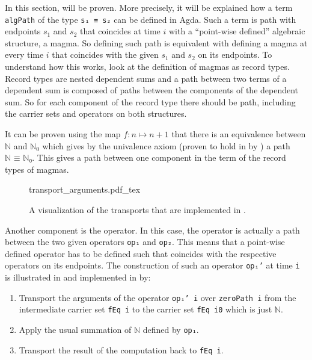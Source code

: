 \documentclass[12pt,a4paper,twoside,xetex]{book} %
\newcommand{\incfig}[1]{%
    \def\svgwidth{0.6\columnwidth}
    {#1.pdf_tex}
}
\begin{document}
In this section,  will be proven. More precisely, it will be explained how a term \texttt{algPath} of the type \texttt{s₁ ≡ s₂} can be defined in Agda. Such a term is path with endpoints $s_1$ and $s_2$ that coincides at time $i$ with a ``point-wise 
defined'' algebraic structure, a magma. So defining such path is equivalent 
with defining a magma at every time $i$ that coincides with the given $s_1$ and 
$s_2$ on its endpoints. To understand how this works, look at the definition of 
magmas as record types. Record types are nested dependent sums and a path 
between two terms of a dependent sum is composed of paths between the 
components of the dependent sum. So for each component of the record type there 
should be path, including the carrier sets and operators on both structures. 

It can be proven using the map $f: n \mapsto n + 1$ that there is an 
equivalence between $\mathbb{N}$ and $\mathbb{N}_0$ which gives by the 
univalence axiom (proven to hold in  by ) a 
path $\texttt{ℕ ≡ ℕ₀}$. This gives a path between one component in the term of 
the record types of magmas. 

\begin{figure}\label{transpop}
\centering
\incfig{transport_arguments}
\caption{A visualization of the transports that are implemented in .}
\end{figure}

Another component is the operator. In this case, the operator is actually a 
path between the two given operators \texttt{op₁} and \texttt{op₂}. This means that a point-wise defined 
operator has to be defined such that coincides with the respective operators on its endpoints. The construction of such an operator \texttt{opᵢ'} at time \texttt{i} is illustrated in  and implemented in  by:

\begin{enumerate}
\item Transport the arguments of the operator \texttt{opᵢ' i} over \texttt{zeroPath i} from the intermediate carrier set \texttt{fEq i} to the carrier set \texttt{fEq i0} which is just $\mathbb{N}$. 
\item Apply the usual summation of $\mathbb{N}$ defined by \texttt{op₁}.
\item Transport the result of the computation back to \texttt{fEq i}.
\end{enumerate}
\end{document}
